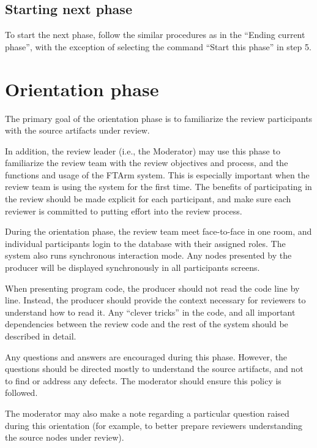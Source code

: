 \subsection* {Starting next phase}
To start the next phase, follow the similar procedures as in the
``Ending current phase'', with the exception of selecting the command
``Start this phase'' in step 5.


\section {Orientation phase}
The primary goal of the orientation phase is to familiarize the
review participants with the source artifacts under review. 

In addition, the review leader (i.e., the Moderator) may use this
phase to familiarize the review team with the review objectives and
process, and the functions and usage of the FTArm system.
This is especially important when 
the review team is using the system for the first time.
The benefits of participating in the review should be made
explicit for each participant, and make sure each reviewer is
committed to putting effort into the review process.

During the orientation phase, the review team meet face-to-face in one room,
and individual participants login to the database with their
assigned roles. 
The system also runs synchronous interaction mode. Any nodes presented
by the producer will be displayed synchronously in all participants
screens. 

When presenting program code, the producer should not read the code line
by line. Instead, the producer should provide the context necessary
for reviewers to understand how to read it. Any ``clever tricks'' in
the code, and all important dependencies between the review code and the
rest of the system should be described in detail. 
 
Any questions and answers are encouraged during this phase. However,
the questions should be directed mostly to understand the source
artifacts, and not to find or address any defects. The moderator
should ensure this policy is followed.

The moderator may also make a note regarding a particular question
raised during this orientation (for example, to better prepare reviewers
understanding the source nodes under review).

